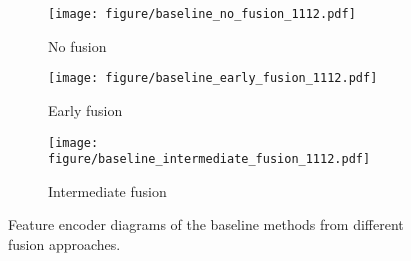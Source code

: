 \begin{figure*}[!t]
        \centering
        \begin{subfigure}[b]{0.32\textwidth}
            \centering 
            \texttt{[image: figure/baseline\_no\_fusion\_1112.pdf]}
            \caption[]%
            {{No fusion}}    
            \label{fig:baseline_no_fusion}
        \end{subfigure}
        \hfill
        \begin{subfigure}[b]{0.32\textwidth}  
            \centering 
            \texttt{[image: figure/baseline\_early\_fusion\_1112.pdf]}
            \caption[]%
            {{Early fusion}}    
            \label{fig:baseline_early_fusion}
        \end{subfigure}
        \hfill
        \begin{subfigure}[b]{0.32\textwidth}
            \centering 
            \texttt{[image: figure/baseline\_intermediate\_fusion\_1112.pdf]}
            \caption[]%
            {{Intermediate fusion~\cite{xu2022cobevt,xu2022v2xvit, xu2022opencood}}}    
            \label{fig:baseline_intermediate_fusion}
        \end{subfigure}
        \hfill
        \vspace{-5pt}
        \caption[]
        {
        Feature encoder diagrams of the baseline methods from different fusion approaches.} 
        \label{fig:baseline}
        \vspace{-10pt}
    \end{figure*}



